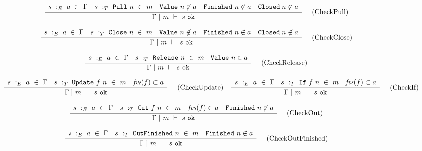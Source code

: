 \begin{figure*}

$$
\frac {\displaystyle 
    \begin{array}{lcccr}
        s~:_E~ a ~\in~ \Gamma                    &
        s ~:_T~ \mathtt{Pull}~n ~\in~m    &
        \mathtt{Value}~n \not\in a             &
        \mathtt{Finished}~n \not\in a          &
        \mathtt{Closed}~n \not\in a
    \end{array}
} {\displaystyle  
    \Gamma ~|~ m ~\vdash~ s~\mathtt{ok}
} \ 
\quad
\textrm{(CheckPull)}
$$

$$
\frac {\displaystyle 
    \begin{array}{lcccr}
        s~:_E~ a ~\in~ \Gamma                    &
        s ~:_T~ \mathtt{Close}~n ~\in~m    &
        \mathtt{Value}~n \not\in a             &
        \mathtt{Finished}~n \not\in a          &
        \mathtt{Closed}~n \not\in a             
    \end{array}
} {\displaystyle  
    \Gamma ~|~ m ~\vdash~ s~\mathtt{ok}
} \ 
\quad
\textrm{(CheckClose)}
$$

$$
\frac {\displaystyle 
    \begin{array}{lcr}
        s~:_E~ a ~\in~ \Gamma                        &
        s ~:_T~ \mathtt{Release}~n ~\in~m    &
        \mathtt{Value}~n \in a
    \end{array}
} {\displaystyle  
    \Gamma ~|~ m ~\vdash~ s~\mathtt{ok}
} \ 
\quad
\textrm{(CheckRelease)}
$$

$$
\frac {\displaystyle 
    \begin{array}{lcr}
        s~:_E~ a ~\in~ \Gamma                        &
        s ~:_T~ \mathtt{Update}~f~n ~\in~m    &
        \mathit{fvs}(f) \subset a
    \end{array}
} {\displaystyle  
    \Gamma ~|~ m ~\vdash~ s~\mathtt{ok}
} \ 
\quad
\textrm{(CheckUpdate)}
\quad
\frac {\displaystyle 
    \begin{array}{lcr}
        s~:_E~ a ~\in~ \Gamma                        &
        s ~:_T~ \mathtt{If}~f~n ~\in~m    &
        \mathit{fvs}(f) \subset a
    \end{array}
} {\displaystyle  
    \Gamma ~|~ m ~\vdash~ s~\mathtt{ok}
} \ 
\quad
\textrm{(CheckIf)}
$$

$$
\frac {\displaystyle 
    \begin{array}{lccr}
        s~:_E~ a ~\in~ \Gamma                      &
        s ~:_T~ \mathtt{Out}~f~n ~\in~m    &
        \mathit{fvs}(f) \subset a                   &
        \mathtt{Finished}~n \not\in a
    \end{array}
} {\displaystyle  
    \Gamma ~|~ m ~\vdash~ s~\mathtt{ok}
} \ 
\quad
\textrm{(CheckOut)}
$$

$$
\frac {\displaystyle 
    \begin{array}{lcr}
        s~:_E~ a ~\in~ \Gamma                            &
        s ~:_T~ \mathtt{OutFinished}~n ~\in~m     &
        \mathtt{Finished}~n    \not\in a
    \end{array}
} {\displaystyle  
    \Gamma ~|~ m ~\vdash~ s~\mathtt{ok}
} \ 
\quad
\textrm{(CheckOutFinished)}
$$


\end{figure*}
